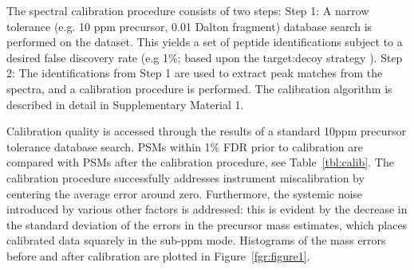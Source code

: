 \documentclass[journal=jprobs,manuscript=article]{achemso}
\begin{document}
The spectral calibration procedure consists of two steps: Step 1: A narrow tolerance (e.g. 10 ppm precursor, 0.01 Dalton fragment) database search is performed on the dataset.
This yields a set of peptide identifications subject to a desired false discovery rate (e.g 1\%; based upon the target:decoy strategy \cite{Elias_2007}).
Step 2:  The identifications from Step 1 are used to extract peak matches from the spectra, and a calibration procedure is performed.
The calibration algorithm is described in detail in Supplementary Material 1.


Calibration quality is accessed through the results of a standard 10ppm precursor tolerance database search.
PSMs within 1\% FDR prior to calibration are compared with PSMs after the calibration procedure, see Table~\ref{tbl:calib}.
The calibration procedure successfully addresses instrument miscalibration by centering the average error around zero.
Furthermore, the systemic noise introduced by various other factors is addressed: this is evident by the decrease in the standard deviation of the errors in the precursor mass estimates, which places calibrated data squarely in the sub-ppm mode.
Histograms of the mass errors before and after calibration are plotted in Figure~\ref{fgr:figure1}.
\end{document}
